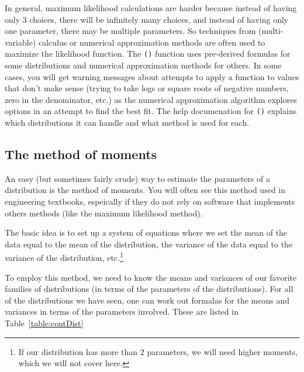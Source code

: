 \documentclass[twoside]{book}\usepackage[]{graphicx}\usepackage[]{xcolor}
\newcommand{\Rindex}[1]{\index{\texttt{#1}}}
\newcommand{\function}[1]{{\color{purple!75!blue}\texttt{\StrSubstitute{#1}{()}{}()}}\Rindex{#1}}
\begin{document}
In general, maximum likelihood calculations are harder because instead of having
only 3 choices, there will be infinitely many choices, and instead of having only
one parameter, there may be multiple parameters.  So techniques from (multi-variable) 
calculus or numerical approximation methods are often used to maximize the likelihood function.
The \function{fitdistr()} function uses pre-derived formulas for some distributions
and numerical approximation methods for others.  In some cases, you will get warning
messages about attempts to apply a function to values that don't make sense (trying to
take logs or square roots of negative numbers, zero in the denominator, etc.) as the 
numerical approximation algorithm explores options in an attempt to find the best fit.
The help documenation for \function{fitdistr()} explains which distributions it can 
handle and what method is used for each.

\subsection{The method of moments}
An easy (but sometimes fairly crude) way to estimate the parameters of a distribution
is the method of moments.  You will often see this method used in engineering textbooks,
espeically if they do not rely on software that implements others methods (like the 
maximum likelihood method).

The basic idea is to set up a system of  equations where we set the mean of the data equal to the mean of the distribution, the variance of the data equal to the variance of the distribution, etc.\footnote{If our distribution has more than 2 parameters, we will need higher moments, which we will not cover here.}  

To employ this method, we need to know the means and variances of our favorite families of distributions (in terms of the parameters of the distributions).  For all of the distributions we have seen, one can work out formalas for the means and variances in terms of the parameters involved.  These are listed in Table~\ref{table:contDist}
\end{document}
